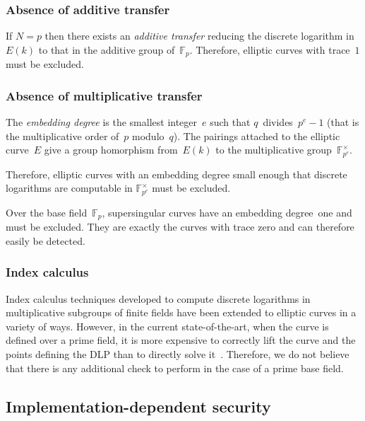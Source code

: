 \documentclass[twocolumn,letterpaper,10pt]{article}
\def\F{\mathbb{F}}
\begin{document}
\subsubsection{Absence of additive transfer}
\label{sss:anomalous}

If $N = p$ then there exists an \emph{additive transfer}
reducing the discrete logarithm in~$E(k)$
to that in the additive group of~$\F_p$.
Therefore, elliptic curves with trace~$1$ must be excluded.

\subsubsection{Absence of multiplicative transfer}
\label{sss:embedding-degree}

The \emph{embedding degree} is the smallest integer~$e$ such that
$q$~divides~$p^e -1$
(that is the multiplicative order of~$p$ modulo~$q$).
The pairings attached to the elliptic curve~$E$
give a group homorphism from~$E(k)$
to the multiplicative group~$\F_{p^e}^{×}$.

Therefore, elliptic curves with an embedding degree small enough
that discrete logarithms are computable in $\F_{p^e}^{×}$
must be excluded.

Over the base field~$\F_p$, supersingular curves
have an embedding degree~one and must be excluded.
They are exactly the curves with trace zero
and can therefore easily be detected.

\subsubsection{Index calculus}

Index calculus techniques developed to compute discrete logarithms
in multiplicative subgroups of finite fields
have been extended to elliptic curves in a variety of ways.
However, in the current state-of-the-art, when the curve is defined over
a prime field, it is more expensive
to correctly lift the curve and the points defining the DLP than
to directly solve it~\cite{asia1998ss,dcc2000silverman,dcc2000ksst,ecc2007silverman,sac2008silverman}.
Therefore, we do not believe that there is any additional check to perform
in the case of a prime base field.

\subsection{Implementation-dependent security}
\label{ss:side}
\end{document}
